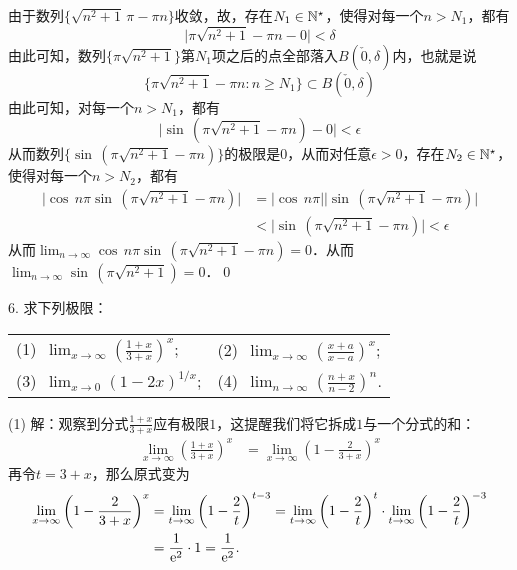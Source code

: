 由于数列$\{ \sqrt{n^2+1} \, \pi - \pi n \}$收敛，故，存在$N_1 \in \mathbb{N}^\star$，使得对每一个$n > N_1$，都有
\begin{equation}
    \big\lvert \pi \sqrt{n^2+1} - \pi n - 0 \big\rvert < \delta
\end{equation}
由此可知，数列$\{ \pi \sqrt{n^2+1}\}$第$N_1$项之后的点全部落入$B(\check{0}, \delta)$内，也就是说
\begin{equation}
\{ \pi \sqrt{n^2+1} - \pi n : n \geq N_1 \} \subset B(\check{0}, \delta)
\end{equation}
由此可知，对每一个$n > N_1$，都有
\begin{equation}
    \bigg\lvert \sin \, \left( \pi \sqrt{n^2+1} - \pi n \right) - 0 \bigg\rvert < \epsilon
\end{equation}
从而数列$\{ \sin \, \left( \pi \sqrt{n^2+1} - \pi n \right) \}$的极限是$0$，从而对任意$\epsilon > 0$，存在$N_2 \in \mathbb{N}^\star$，使得对每一个$n > N_2$，都有
\begin{align}
    \bigg\lvert \cos \, n \pi \sin \, \left( \pi \sqrt{n^2+1} - \pi n \right) \bigg\rvert &= |\cos \, n \pi| \bigg\lvert \sin \, \left(\pi \sqrt{n^2+1} - \pi n\right) \bigg\rvert \\
    &< \bigg\lvert \sin \, \left(\pi \sqrt{n^2+1} - \pi n \right) \bigg\rvert < \epsilon
\end{align}
从而$\displaystyle\lim_{n \to \infty} \cos \, n \pi \sin \, \left(\pi \sqrt{n^2+1} - \pi n \right) = 0$．从而$\displaystyle\lim_{n \to \infty} \sin \, \left(\pi \sqrt{n^2+1}\right) = 0$．\qed

6. 求下列极限：

\begin{table}[H]
    \centering
    \begin{tabularx}{\textwidth} {  >{\raggedright\arraybackslash}X >{\raggedright\arraybackslash}X  }
       (1)~$\displaystyle\lim_{x \to \infty} \left(\displaystyle\frac{1+x}{3+x}\right)^x$; & (2)~$\displaystyle\lim_{x\to\infty}\left(\displaystyle\frac{x+a}{x-a}\right)^x$; \\[1em]
       (3)~$\displaystyle\lim_{x\to 0}\left(1-2x\right)^{1/x}$; & (4)~$\displaystyle\lim_{n \to \infty}\left(\displaystyle\frac{n+x}{n-2}\right)^n$.
    \end{tabularx}
\end{table}

(1) 解：观察到分式$\displaystyle\frac{1+x}{3+x}$应有极限$1$，这提醒我们将它拆成$1$与一个分式的和：
\begin{align}
    \lim_{x \to \infty} \left(\displaystyle\frac{1+x}{3+x}\right)^x &= \lim_{x \to \infty} \left(1 - \displaystyle\frac{2}{3+x} \right)^x
\end{align}
再令$t = 3+x$，那么原式变为
\begin{align}
    \lim_{x \to \infty} \left(1 - \displaystyle\frac{2}{3+x} \right)^x &= \lim_{t \to \infty} \left(1 - \displaystyle\frac{2}{t}\right)^{t-3} = \displaystyle\lim_{t \to \infty} \left(1-\displaystyle\frac{2}{t}\right)^t \cdot \lim_{t \to \infty} \left(1-\displaystyle\frac{2}{t}\right)^{-3} \\
    &= \displaystyle\frac{1}{\mathrm{e}^2} \cdot 1 = \frac{1}{\mathrm{e}^2}.
\end{align}

